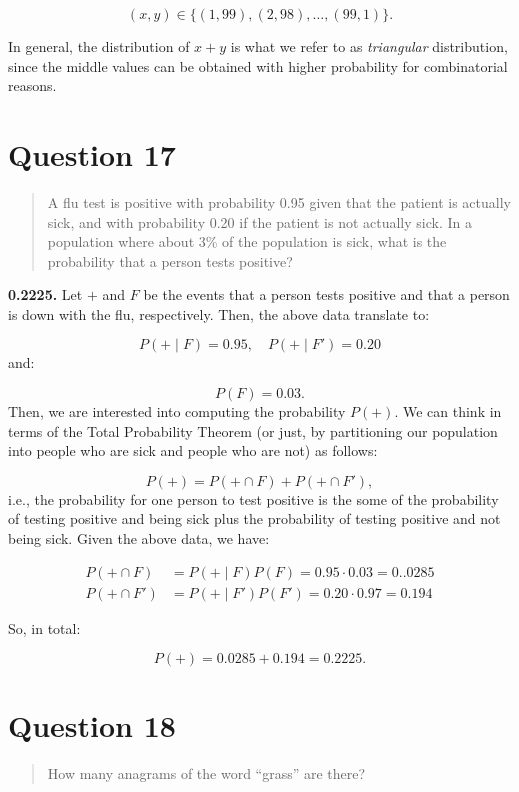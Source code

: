 \documentclass[
]{article}
\begin{document}
\[(x,y)\in\{(1,99),(2,98),\ldots,(99,1)\}.\]

In general, the distribution of \(x+y\) is what we refer to as
\emph{triangular} distribution, since the middle values can be obtained
with higher probability for combinatorial reasons.

\section{Question 17}\label{question-17}

\begin{quote}
A flu test is positive with probability 0.95 given that the patient is
actually sick, and with probability 0.20 if the patient is not actually
sick. In a population where about 3\% of the population is sick, what is
the probability that a person tests positive?
\end{quote}

\textbf{0.2225.} Let \(+\) and \(F\) be the events that a person tests
positive and that a person is down with the flu, respectively. Then, the
above data translate to:

\[P(+\mid F)=0.95,\quad P(+\mid F')=0.20\] and:

\[P(F)=0.03.\] Then, we are interested into computing the probability
\(P(+)\). We can think in terms of the Total Probability Theorem (or
just, by partitioning our population into people who are sick and people
who are not) as follows:

\[P(+)=P(+\cap F)+P(+\cap F'),\] i.e., the probability for one person to
test positive is the some of the probability of testing positive and
being sick plus the probability of testing positive and not being sick.
Given the above data, we have:

\[
\begin{aligned}
  P(+\cap F)&=P(+\mid F)P(F)=0.95\cdot0.03=0..0285\\
  P(+\cap F')&=P(+\mid F')P(F')=0.20\cdot0.97=0.194
\end{aligned}
\]

So, in total:

\[P(+)=0.0285+0.194=0.2225.\]

\section{Question 18}\label{question-18}

\begin{quote}
How many anagrams of the word ``grass'' are there?
\end{quote}
\end{document}
